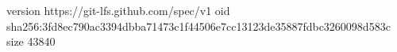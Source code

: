 version https://git-lfs.github.com/spec/v1
oid sha256:3fd8ec790ac3394dbba71473c1f44506e7cc13123de35887fdbc3260098d583c
size 43840
